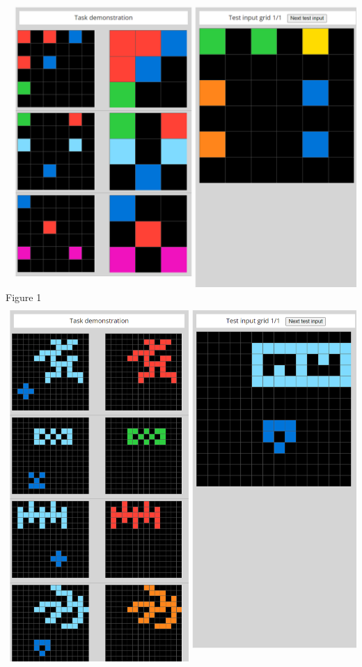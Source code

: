 \documentclass[letterpaper]{article} %
\begin{document}
\begin{center}
    \includegraphics[scale = 0.22]{solved_1.png}\\
    Figure 1\\
    \vspace{\baselineskip}\vspace{\baselineskip}
    \includegraphics[scale = 0.22]{solved_2.png}\\

\end{center}
\end{document}
